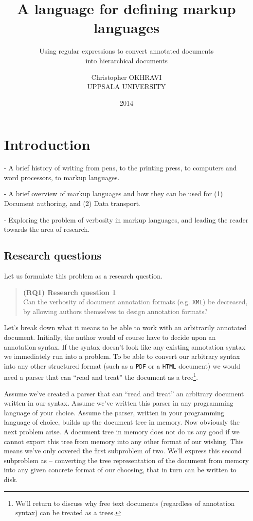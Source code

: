 \documentclass{scrreprt}
\date{2014}
\title{ A language for defining markup languages }
\subtitle{ Using regular expressions to convert annotated documents \\into hierarchical documents }
\author{ Christopher OKHRAVI \\ UPPSALA UNIVERSITY }
\newcommand\researchquestionformat[1]{\begin{quote}#1\end{quote}}
\newcommand\firstresearchquestion{\researchquestionformat{%
  \textbf{(RQ1) Research question 1} \\
  Can the verbosity of document annotation formats (e.g. \texttt{XML}) be decreased, by allowing authors themselves to design annotation formats?%
}}
\begin{document}
\maketitle
\tableofcontents
\pagebreak



\glsaddall
\printglossary





\chapter{Introduction}
- A brief history of writing from pens, to the printing press, to computers and word processors, to markup languages.
 
- A brief overview of markup languages and how they can be used for (1) Document authoring, and (2) Data transport.

- Exploring the problem of verbosity in markup languages, and leading the reader towards the area of research.



\section{Research questions}
Let us formulate this problem as a research question.

\firstresearchquestion

Let's break down what it means to be able to work with an arbitrarily annotated document. Initially, the author would of course have to decide upon an annotation syntax. If the syntax doesn't look like any existing annotation syntax we immediately run into a problem. To be able to convert our arbitrary syntax into any other structured format (such as a \texttt{PDF} or a \texttt{HTML} document) we would need a parser that can ``read and treat'' the document as a tree\footnote{ We'll return to discuss why free text documents (regardless of annotation syntax) can be treated as a trees.}.

Assume we've created a parser that can ``read and treat'' an arbitrary document written in our syntax. Assume we've written this parser in any programming language of your choice. Assume the parser, written in your programming language of choice, builds up the document tree in memory. Now obviously the next problem arise. A document tree in memory does not do us any good if we cannot export this tree from memory into any other format of our wishing. This means we've only covered the first subproblem of two. We'll express this second subproblem as -- converting the tree representation of the document from memory into any given concrete format of our choosing, that in turn can be written to disk.
\end{document}
